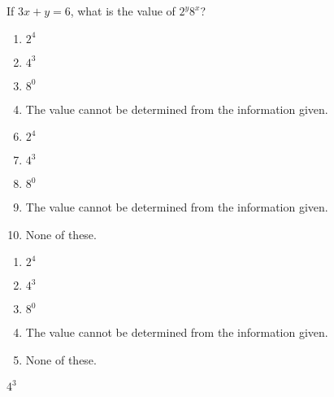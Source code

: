  
If $3x+y=6$, what is the value of $2^y8^x$?


\ifsat
	\begin{enumerate}[label=\Alph*)]
		\item $2^4 $
		\item $4^3 $ %
		\item $8^0 $
		\item The value cannot be determined from the information given.
	\end{enumerate}
\else
\fi

\ifacteven
	\begin{enumerate}[label=\textbf{\Alph*.},itemsep=\fill,align=left]
		\setcounter{enumii}{5}
		\item $2^4 $
		\item $4^3 $ %
		\item $8^0 $
		\addtocounter{enumii}{1}
		\item The value cannot be determined from the information given.
		\item None of these. 
	\end{enumerate}
\else
\fi

\ifactodd
	\begin{enumerate}[label=\textbf{\Alph*.},itemsep=\fill,align=left]
		\item $2^4 $
		\item $4^3 $ %
		\item $8^0 $
		\item The value cannot be determined from the information given.
		\item None of these. 
	\end{enumerate}
\else
\fi

\ifgridin
 $4^3 $ %
		
\else
\fi

